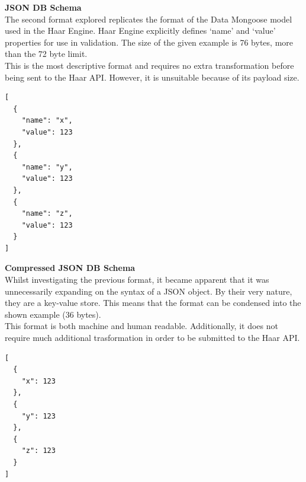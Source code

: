     \noindent
    \begin{minipage}[t]{0.45\textwidth}
      \textbf{JSON DB Schema}\\
      The second format explored replicates the format of the Data Mongoose model used in the Haar Engine. Haar Engine explicitly defines `name' and `value' properties for use in validation. The size of the given example is 76 bytes, more than the 72 byte limit.\\

      This is the most descriptive format and requires no extra transformation before being sent to the Haar API. However, it is unsuitable because of its payload size.
    \end{minipage}
    \hfill
    \begin{minipage}[t]{0.45\textwidth}
      \begin{lstlisting}[frame=single]
[
  {
    "name": "x",
    "value": 123
  },
  {
    "name": "y",
    "value": 123
  },
  {
    "name": "z",
    "value": 123
  }
]
      \end{lstlisting}
    \end{minipage}

    \noindent
    \begin{minipage}[t]{0.45\textwidth}
      \textbf{Compressed JSON DB Schema}\\
      Whilst investigating the previous format, it became apparent that it was unnecessarily expanding on the syntax of a JSON object. By their very nature, they are a key-value store. This means that the format can be condensed into the shown example (36 bytes).\\

      This format is both machine and human readable. Additionally, it does not require much additional trasformation in order to be submitted to the Haar API.\\
    \end{minipage}
    \hfill
    \begin{minipage}[t]{0.45\textwidth}
      \begin{lstlisting}[frame=single]
[
  {
    "x": 123
  },
  {
    "y": 123
  },
  {
    "z": 123
  }
]
      \end{lstlisting}
    \end{minipage}

